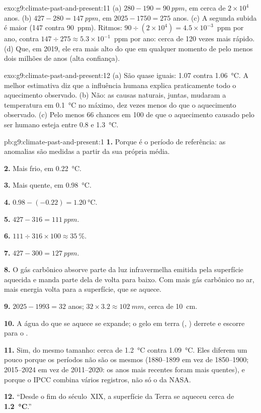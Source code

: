 \begin{solution}{exo:g9:climate-past-and-present:11}
(a) $280 - 190 = \qty{90}{ppm}$, em cerca de $2 \times 10^4$ anos. (b) $427
- 280 = \qty{147}{ppm}$, em $2025 - 1750 = 275$ anos. (c) A segunda
subida é maior (147 contra 90~ppm). Ritmos: $90 \div (2 \times 10^4) =
4.5 \times 10^{-3}$~ppm por ano, contra $147 \div 275 \approx 5.3 \times
10^{-1}$~ppm por ano: cerca de 120 vezes mais rápido. (d) Que, em 2019,
ele era mais alto do que em qualquer momento de pelo menos dois milhões
de anos (alta confiança).
\end{solution}

\begin{solution}{exo:g9:climate-past-and-present:12}
(a) São quase iguais: 1.07 contra \qty{1.06}{\degreeCelsius}. A melhor
estimativa diz que a influência humana explica praticamente todo o
aquecimento observado. (b) Não: as causas naturais, juntas, mudaram a
temperatura em \qty{0.1}{\degreeCelsius} no máximo, dez vezes menos do
que o aquecimento observado. (c) Pelo menos 66 chances em 100 de que o
aquecimento causado pelo ser humano esteja entre 0.8 e
\qty{1.3}{\degreeCelsius}.
\end{solution}

\begin{solution}{pb:g9:climate-past-and-present:1}
\textbf{1.} Porque é o período de referência: as anomalias são medidas a
partir da sua própria média.

\textbf{2.} Mais frio, em \qty{0.22}{\degreeCelsius}.

\textbf{3.} Mais quente, em \qty{0.98}{\degreeCelsius}.

\textbf{4.} $0.98 - (-0.22) = \qty{1.20}{\degreeCelsius}$.

\textbf{5.} $427 - 316 = \qty{111}{ppm}$.

\textbf{6.} $111 \div 316 \times 100 \approx 35~\%$.

\textbf{7.} $427 - 300 = \qty{127}{ppm}$.

\textbf{8.} O gás carbônico absorve parte da luz infravermelha emitida
pela superfície aquecida e manda parte dela de volta para baixo. Com mais
gás carbônico no ar, mais energia volta para a superfície, que se aquece.

\textbf{9.} $2025 - 1993 = 32$ anos; $32 \times 3.2 \approx
\qty{102}{mm}$, cerca de \qty{10}{cm}.

\textbf{10.} A água do  que se aquece se expande; o gelo em terra
(, ) derrete e escorre para o .

\textbf{11.} Sim, do mesmo tamanho: cerca de \qty{1.2}{\degreeCelsius}
contra \qty{1.09}{\degreeCelsius}. Eles diferem um pouco porque os
períodos não são os mesmos (1880--1899 em vez de 1850--1900; 2015--2024
em vez de 2011--2020: os anos mais recentes foram mais quentes), e porque
o IPCC combina vários registros, não só o da NASA.

\textbf{12.} ``Desde o fim do século~XIX, a superfície da Terra se
aqueceu cerca de \textbf{\qty{1.2}{\degreeCelsius}}.''
\end{solution}
